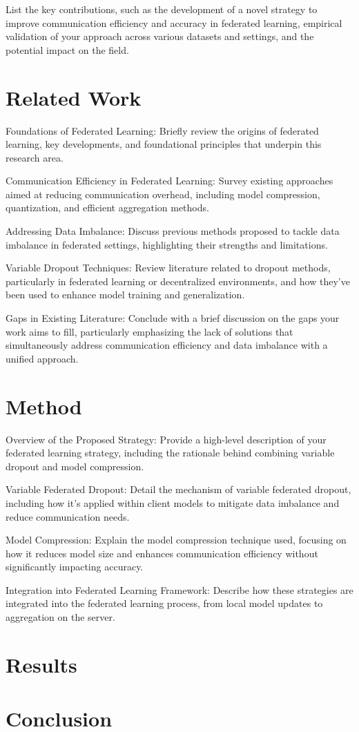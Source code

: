 \documentclass{article}
\begin{document}
List the key contributions, such as the development of a novel strategy to improve communication efficiency and accuracy in federated learning, empirical validation of your approach across various datasets and settings, and the potential impact on the field.

\section{Related Work}

Foundations of Federated Learning: Briefly review the origins of federated learning, key developments, and foundational principles that underpin this research area.

Communication Efficiency in Federated Learning: Survey existing approaches aimed at reducing communication overhead, including model compression, quantization, and efficient aggregation methods.

Addressing Data Imbalance: Discuss previous methods proposed to tackle data imbalance in federated settings, highlighting their strengths and limitations.

Variable Dropout Techniques: Review literature related to dropout methods, particularly in federated learning or decentralized environments, and how they've been used to enhance model training and generalization.

Gaps in Existing Literature: Conclude with a brief discussion on the gaps your work aims to fill, particularly emphasizing the lack of solutions that simultaneously address communication efficiency and data imbalance with a unified approach.


\section{Method}

Overview of the Proposed Strategy: Provide a high-level description of your federated learning strategy, including the rationale behind combining variable dropout and model compression.

Variable Federated Dropout: Detail the mechanism of variable federated dropout, including how it's applied within client models to mitigate data imbalance and reduce communication needs.

Model Compression: Explain the model compression technique used, focusing on how it reduces model size and enhances communication efficiency without significantly impacting accuracy.

Integration into Federated Learning Framework: Describe how these strategies are integrated into the federated learning process, from local model updates to aggregation on the server.

\section{Results}

\section{Conclusion}
\end{document}
